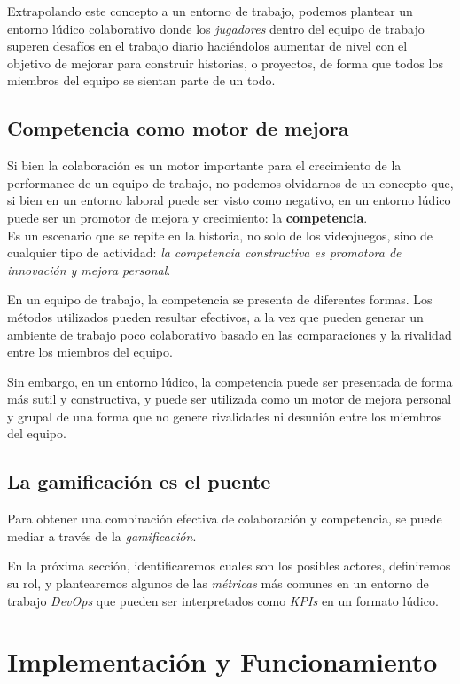 \documentclass[journal]{IEEEtran}
\begin{document}
Extrapolando este concepto a un entorno de trabajo, podemos plantear un entorno lúdico colaborativo donde los \textit{jugadores} dentro del equipo de trabajo superen desafíos en el trabajo diario haciéndolos aumentar de nivel con el objetivo de mejorar para construir historias, o proyectos, de forma que todos los miembros del equipo se sientan parte de un todo.

\subsection{\textbf{Competencia como motor de mejora}}
Si bien la colaboración es un motor importante para el crecimiento de la performance de un equipo de trabajo, no podemos olvidarnos de un concepto que, si bien en un entorno laboral puede ser visto como negativo, en un entorno lúdico puede ser un promotor de mejora y crecimiento: la \textbf{competencia}.
\\Es un escenario que se repite en la historia, no solo de los videojuegos, sino de cualquier tipo de actividad: \textit{la competencia constructiva es promotora de innovación y mejora personal}.

En un equipo de trabajo, la competencia se presenta de diferentes formas. Los métodos utilizados pueden resultar efectivos, a la vez que pueden generar un ambiente de trabajo poco colaborativo basado en las comparaciones y la rivalidad entre los miembros del equipo.

Sin embargo, en un entorno lúdico, la competencia puede ser presentada de forma más sutil y constructiva, y puede ser utilizada como un motor de mejora personal y grupal de una forma que no genere rivalidades ni desunión entre los miembros del equipo.

\subsection{\textbf{La gamificación es el puente}}
Para obtener una combinación efectiva de colaboración y competencia, se puede mediar a través de la \textit{gamificación}. 

En la próxima sección, identificaremos cuales son los posibles actores, definiremos su rol, y plantearemos algunos de las \textit{métricas} más comunes en un entorno de trabajo \textit{DevOps} que pueden ser interpretados como \textit{KPIs} en un formato lúdico.

\section{\textbf{\Large Implementación y Funcionamiento}}
\end{document}
